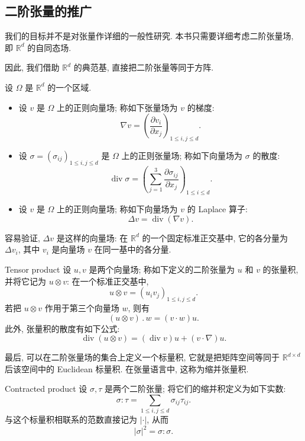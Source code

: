 \subsection{二阶张量的推广}
\label{sec:app-a-second-order-tensors}
\renewcommand{\thestatement}{A.2.\arabic{statement}}
\renewcommand{\theHstatement}{appA.sec02.\arabic{statement}}
\setcounter{statement}{0}

我们的目标并不是对张量作详细的一般性研究. 本书只需要详细考虑二阶张量场, 即 $\mathbb R^d$ 的自同态场.

因此, 我们借助 $\mathbb R^d$ 的典范基, 直接把二阶张量等同于方阵.

\begin{Definition}
\label{def:app-a-tensor-gradient-divergence-laplacian}
设 $\Omega$ 是 $\mathbb R^d$ 的一个区域.
\begin{itemize}
 \item 设 $v$ 是 $\Omega$ 上的正则向量场; 称如下张量场为 $v$ 的梯度:
 \[
  \nabla v=\left(\frac{\partial v_i}{\partial x_j}\right)_{1\leq i,j\leq d}.
 \]
 \item 设 $\sigma=(\sigma_{ij})_{1\leq i,j\leq d}$ 是 $\Omega$ 上的正则张量场; 称如下向量场为 $\sigma$ 的散度:
 \[
  \operatorname{div}\sigma
  =\left(\sum_{j=1}^{3}\frac{\partial\sigma_{ij}}{\partial x_j}\right)_{1\leq i\leq d}.
 \]
 \item 设 $v$ 是 $\Omega$ 上的正则向量场; 称如下向量场为 $v$ 的 Laplace 算子:
 \[
  \Delta v=\operatorname{div}(\nabla v).
 \]
\end{itemize}
容易验证, $\Delta v$ 是这样的向量场: 在 $\mathbb R^d$ 的一个固定标准正交基中, 它的各分量为 $\Delta v_i$, 其中 $v_i$ 是向量场 $v$ 在同一基中的各分量.
\end{Definition}

\begin{Definition}{Tensor product}
\label{def:app-a-tensor-product}
设 $u,v$ 是两个向量场; 称如下定义的二阶张量为 $u$ 和 $v$ 的张量积, 并将它记为 $u\otimes v$: 在一个标准正交基中,
\[
 u\otimes v=(u_iv_j)_{1\leq i,j\leq d}.
\]
若把 $u\otimes v$ 作用于第三个向量场 $w$, 则有
\[
 (u\otimes v)\mathbin{.}w=(v\cdot w)u.
\]
此外, 张量积的散度有如下公式:
\begin{equation}
 \operatorname{div}(u\otimes v)=(\operatorname{div}v)u+(v\cdot\nabla)u.
 \label{eq:app-a-divergence-tensor-product}
\end{equation}
\end{Definition}

最后, 可以在二阶张量场的集合上定义一个标量积, 它就是把矩阵空间等同于 $\mathbb R^{d\times d}$ 后该空间中的 Euclidean 标量积. 在张量语言中, 这称为缩并张量积.

\begin{Definition}{Contracted product}
\label{def:app-a-contracted-product}
设 $\sigma,\tau$ 是两个二阶张量; 将它们的缩并积定义为如下实数:
\[
 \sigma:\tau=\sum_{1\leq i,j\leq d}\sigma_{ij}\tau_{ij}.
\]
与这个标量积相联系的范数直接记为 $|\cdot|$, 从而
\[
 |\sigma|^2=\sigma:\sigma.
\]
\end{Definition}
